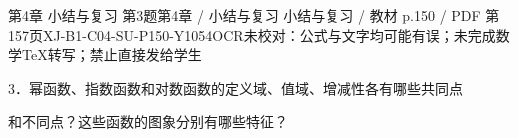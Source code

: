 \begin{bankitem}{第4章 小结与复习 第3题}{第4章 / 小结与复习 小结与复习 / 教材 p.150 / PDF 第157页}{XJ-B1-C04-SU-P150-Y1054}{OCR未校对：公式与文字均可能有误；未完成数学TeX转写；禁止直接发给学生}
\begin{ocrdraft}
\par
3．幂函数、指数函数和对数函数的定义域、值域、增减性各有哪些共同点
\par
和不同点？这些函数的图象分别有哪些特征？
\end{ocrdraft}
\end{bankitem}
